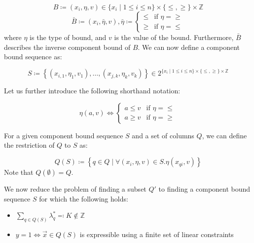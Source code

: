 \begin{equation}
B \coloneqq \left( x_i, \eta, v \right) \in \{x_i \mid 1 \leq i \leq n\} \times \{\leq, \geq\} \times \mathbb{Z}
\end{equation}
\begin{equation}
\bar{B} \coloneqq \left( x_i, \bar{\eta}, v \right), \bar{\eta} \coloneqq \begin{cases} \leq & \text{if } \eta = \geq \\ \geq & \text{if } \eta = \leq \end{cases}
\end{equation}
where $\eta$ is the type of bound, and $v$ is the value of the bound. Furthermore, $\bar{B}$ describes the inverse component bound of $B$. We can now define a component bound sequence as:

\begin{equation}
S \coloneqq \left\{ \left( x_{i,1}, \eta_1, v_1 \right), \dots, \left( x_{j,k}, \eta_k, v_k \right) \right\} \in 2^{\{x_i \mid 1 \leq i \leq n\} \times \{\leq, \geq\} \times \mathbb{Z}}
\end{equation}

Let us further introduce the following shorthand notation:

\begin{equation}
\eta(a, v) \Leftrightarrow
\begin{cases}
a \leq v & \text{if } \eta = \leq \\
a \geq v & \text{if } \eta = \geq
\end{cases}
\end{equation}

For a given component bound sequence $S$ and a set of columns $Q$, we can define the restriction of $Q$ to $S$ as:

\begin{equation}
Q(S) \coloneqq \left\{ q \in Q \mid \forall \left( x_i, \eta, v \right) \in S. \eta(x_{qi}, v) \right\}
\end{equation}
Note that $Q(\emptyset) = Q$.

We now reduce the problem of finding a subset $Q'$ to finding a component bound sequence $S$ for which the following holds:

\begin{itemize}
\item $\sum_{q \in Q(S)} \lambda_q^* \eqqcolon K \not\in \mathbb{Z}$
\item $y = 1 \Leftrightarrow \vec{x} \in Q(S)$ is expressible using a finite set of linear constraints
\end{itemize}

